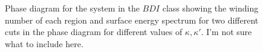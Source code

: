 \documentclass[twocolumn,amsmath,longbibliography,amssymb,superscriptaddress]{revtex4-1}
\newcommand{\carlos}[1]{{\color{red} #1}}
\begin{document}
\begin{figure}[h!]
\centering
{}\hspace{0mm}

\hspace{0mm}

\caption{Phase diagram for the system in the $BDI$ class showing the winding number of each region and surface energy spectrum for two different cuts in the phase diagram for different values of $\kappa,\kappa'$. \carlos{I'm not sure what to include here.}}
\label{bdi_phase_diagram}
\end{figure}
\end{document}
